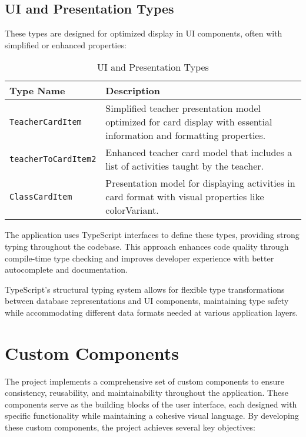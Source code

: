 \subsection{UI and Presentation Types}

These types are designed for optimized display in UI components, often with simplified or enhanced properties:

\begin{table}[H]
    \centering
    \begin{tabular}{|p{4cm}|p{9cm}|}
        \hline
        \rowcolor{bluepoli!20}
        \textbf{Type Name} & \textbf{Description} \\
        \hline
        \texttt{TeacherCardItem} & Simplified teacher presentation model optimized for card display with essential information and formatting properties. \\
        \hline
        \texttt{teacherToCardItem2} & Enhanced teacher card model that includes a list of activities taught by the teacher. \\
        \hline
        \texttt{ClassCardItem} & Presentation model for displaying activities in card format with visual properties like colorVariant. \\
        \hline
    \end{tabular}
    \caption{UI and Presentation Types}
\end{table}

The application uses TypeScript interfaces to define these types, providing strong typing throughout the codebase. This approach enhances code quality through compile-time type checking and improves developer experience with better autocomplete and documentation.

TypeScript's structural typing system allows for flexible type transformations between database representations and UI components, maintaining type safety while accommodating different data formats needed at various application layers.

\section{Custom Components}

The project implements a comprehensive set of custom components to ensure consistency, reusability, and maintainability throughout the application. These components serve as the building blocks of the user interface, each designed with specific functionality while maintaining a cohesive visual language. By developing these custom components, the project achieves several key objectives:

